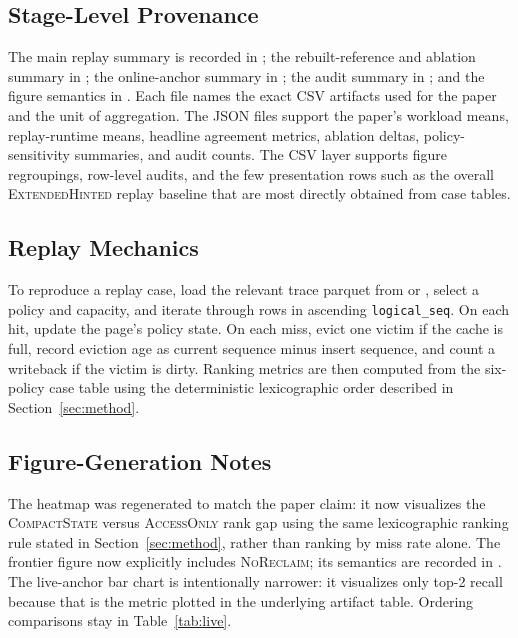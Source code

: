 \documentclass{article}
\newcommand{\traceext}{\textsc{ExtendedHinted}}
\newcommand{\tracecompact}{\textsc{CompactState}}
\newcommand{\traceaccess}{\textsc{AccessOnly}}
\newcommand{\tracenoreclaim}{\textsc{NoReclaim}}
\begin{document}
\subsection{Stage-Level Provenance}
The main replay summary is recorded in ; the rebuilt-reference and ablation summary in ; the online-anchor summary in ; the audit summary in ; and the figure semantics in . Each file names the exact CSV artifacts used for the paper and the unit of aggregation. The JSON files support the paper's workload means, replay-runtime means, headline agreement metrics, ablation deltas, policy-sensitivity summaries, and audit counts. The CSV layer supports figure regroupings, row-level audits, and the few presentation rows such as the overall \traceext{} replay baseline that are most directly obtained from case tables.

\subsection{Replay Mechanics}
To reproduce a replay case, load the relevant trace parquet from  or , select a policy and capacity, and iterate through rows in ascending \texttt{logical\_seq}. On each hit, update the page's policy state. On each miss, evict one victim if the cache is full, record eviction age as current sequence minus insert sequence, and count a writeback if the victim is dirty. Ranking metrics are then computed from the six-policy case table using the deterministic lexicographic order described in Section~\ref{sec:method}.

\subsection{Figure-Generation Notes}
The heatmap was regenerated to match the paper claim: it now visualizes the \tracecompact{} versus \traceaccess{} rank gap using the same lexicographic ranking rule stated in Section~\ref{sec:method}, rather than ranking by miss rate alone. The frontier figure now explicitly includes \tracenoreclaim{}; its semantics are recorded in . The live-anchor bar chart is intentionally narrower: it visualizes only top-2 recall because that is the metric plotted in the underlying artifact table. Ordering comparisons stay in Table~\ref{tab:live}.



\end{document}
